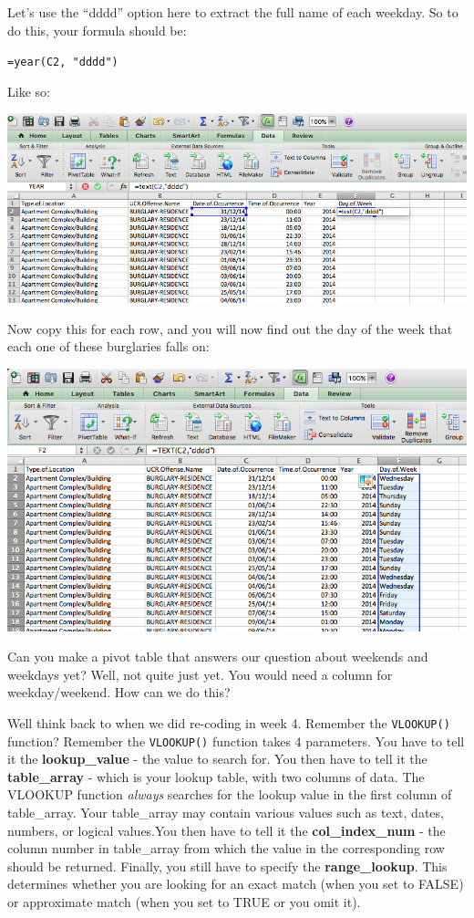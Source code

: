 \documentclass[]{book}
\theoremstyle{definition}
\theoremstyle{definition}
\theoremstyle{definition}
\theoremstyle{remark}
\begin{document}
Let's use the ``dddd'' option here to extract the full name of each
weekday. So to do this, your formula should be:

\texttt{=year(C2,\ "dddd")}

Like so:

\includegraphics{imgs/c2_dddd.png}

Now copy this for each row, and you will now find out the day of the
week that each one of these burglaries falls on:

\includegraphics{imgs/dow_col.png}

Can you make a pivot table that answers our question about weekends and
weekdays yet? Well, not quite just yet. You would need a column for
weekday/weekend. How can we do this?

Well think back to when we did re-coding in week 4. Remember the
\texttt{VLOOKUP()} function? Remember the \texttt{VLOOKUP()} function
takes 4 parameters. You have to tell it the \textbf{lookup\_value} - the
value to search for. You then have to tell it the \textbf{table\_array}
- which is your lookup table, with two columns of data. The VLOOKUP
function \emph{always} searches for the lookup value in the first column
of table\_array. Your table\_array may contain various values such as
text, dates, numbers, or logical values.You then have to tell it the
\textbf{col\_index\_num} - the column number in table\_array from which
the value in the corresponding row should be returned. Finally, you
still have to specify the \textbf{range\_lookup}. This determines
whether you are looking for an exact match (when you set to FALSE) or
approximate match (when you set to TRUE or you omit it).
\end{document}
